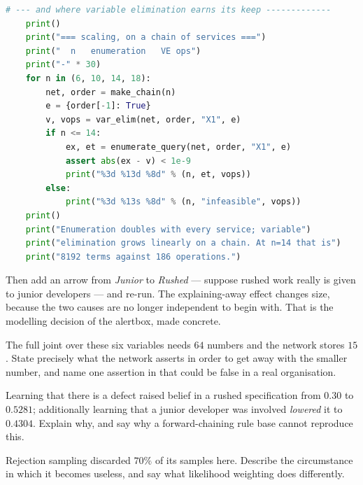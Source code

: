 \begin{lab}
\begin{lstlisting}[language=Python]
    # --- and where variable elimination earns its keep -------------
    print()
    print("=== scaling, on a chain of services ===")
    print("  n   enumeration   VE ops")
    print("-" * 30)
    for n in (6, 10, 14, 18):
        net, order = make_chain(n)
        e = {order[-1]: True}
        v, vops = var_elim(net, order, "X1", e)
        if n <= 14:
            ex, et = enumerate_query(net, order, "X1", e)
            assert abs(ex - v) < 1e-9
            print("%3d %13d %8d" % (n, et, vops))
        else:
            print("%3d %13s %8d" % (n, "infeasible", vops))
    print()
    print("Enumeration doubles with every service; variable")
    print("elimination grows linearly on a chain. At n=14 that is")
    print("8192 terms against 186 operations.")
\end{lstlisting}
Then add an arrow from \emph{Junior} to \emph{Rushed} --- suppose rushed work really
is given to junior developers --- and re-run. The explaining-away effect changes
size, because the two causes are no longer independent to begin with. That is the
modelling decision of the alertbox, made concrete.
\end{lab}

\begin{checkpoint}
\begin{tightnum}
  \item The full joint over these six variables needs $64$ numbers and the network
        stores $15$. State precisely what the network asserts in order to get away
        with the smaller number, and name one assertion in  that
        could be false in a real organisation.
  \item Learning that there is a defect raised belief in a rushed specification from
        $0.30$ to $0.5281$; additionally learning that a junior developer was
        involved \emph{lowered} it to $0.4304$. Explain why, and say why a
        forward-chaining rule base cannot reproduce this.
  \item Rejection sampling discarded $70\%$ of its samples here. Describe the
        circumstance in which it becomes useless, and say what likelihood weighting
        does differently.
\end{tightnum}
\end{checkpoint}


